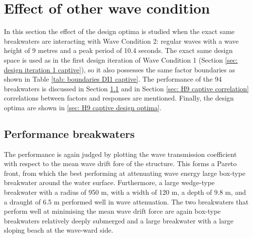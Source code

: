 


\section{Effect of other wave condition}
\label{sec: WC2 captive}

In this section the effect of the design optima is studied when the exact same breakwaters are interacting with Wave Condition 2: regular waves with a wave height of 9 metres and a peak period of 10.4 seconds. The exact same design space is used as in the first design iteration of Wave Condition 1 (Section \ref{sec: design iteration 1 captive}), so it also possesses the same factor boundaries as shown in Table \ref{tab: boundaries DI1 captive}. The performance of the 94 breakwaters is discussed in Section \ref{sec: DI1 captive H9 performance bw} and in Section \ref{sec: H9 captive correlation} correlations between factors and responses are mentioned. Finally, the design optima are shown in \ref{sec: H9 captive design optima}. 





\subsection{Performance breakwaters}
\label{sec: DI1 captive H9 performance bw}

The performance is again judged by plotting the wave transmission coefficient with respect to the mean wave drift fore of the structure. This forms a Pareto front, from which the best performing at attenuating wave energy large box-type breakwater around the water surface. Furthermore, a large wedge-type breakwater with a radius of 950 m, with a width of 120 m, a depth of 9.8 m, and a draught of 6.5 m performed well in wave attenuation. The two breakwaters that perform well at minimising the mean wave drift force are again box-type breakwaters relatively deeply submerged and a large breakwater with a large sloping beach at the wave-ward side. 

